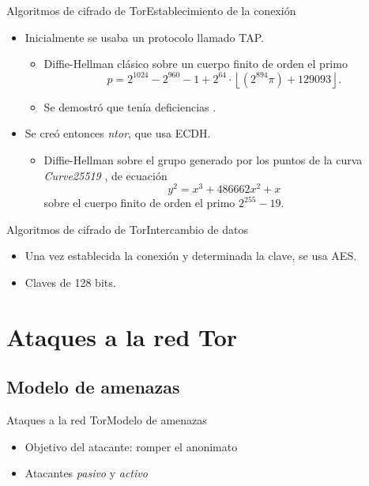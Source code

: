 \documentclass[spanish]{beamer}
\begin{document}
\begin{frame}{Algoritmos de cifrado de Tor}{Establecimiento de la conexión}

  \begin{itemize}
    \item Inicialmente se usaba un protocolo llamado TAP. \begin{itemize}
      \item Diffie-Hellman clásico sobre un cuerpo finito de orden el primo \parencite{carrel_internet_1998} \[
        p = 2^{1024} - 2^{960} - 1 + 2^{64} \cdot \left\lfloor (2^{894} \pi) + 129093 \right\rfloor.
      \]
      \item Se demostró que tenía deficiencias \parencite{hutchison_security_2006}.
    \end{itemize}
    \item Se creó entonces \textit{ntor}, que usa ECDH. \begin{itemize}
      \item Diffie-Hellman sobre el grupo generado por los puntos de la curva \textit{Curve25519} \parencite{yung_curve25519:_2006}, de ecuación \[y^{2}=x^{3}+486662x^{2}+x\] sobre el cuerpo finito de orden el primo \(2^{255}-19\).
    \end{itemize}
  \end{itemize}

\end{frame}

\begin{frame}{Algoritmos de cifrado de Tor}{Intercambio de datos}

  \begin{itemize}
    \item Una vez establecida la conexión y determinada la clave, se usa AES.
    \item Claves de 128 bits.
  \end{itemize}

\end{frame}

\section{Ataques a la red Tor}

\subsection{Modelo de amenazas}

\begin{frame}{Ataques a la red Tor}{Modelo de amenazas}
  \begin{itemize}
  \item Objetivo del atacante: romper el anonimato
  \item Atacantes \emph{pasivo} y \emph{activo}
  \end{itemize}
\end{frame}
\end{document}
